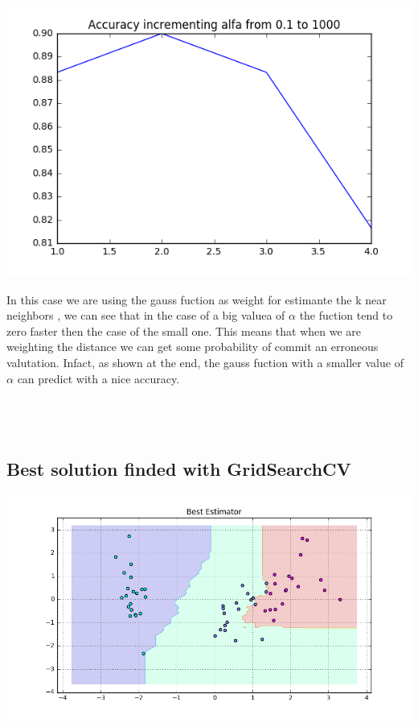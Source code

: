 \documentclass[11pt]{article}
\theoremstyle{plain}
\begin{document}
\begin{center}
\includegraphics[scale=0.44]{5}
\end{center}

In this case we are using the gauss fuction as weight for estimante the k near neighbors , we can see that in the case of a big valuea of  $\alpha$ the fuction tend to zero faster then the case of the small one.
This means that when we are weighting the distance we can get some probability of commit an erroneous valutation. Infact, as shown at the end, the gauss fuction with a smaller value of $\alpha$ can predict with a nice accuracy. 
\\
\\
\\
\\
\subsection{Best solution finded with GridSearchCV}


\begin{center}
\includegraphics[scale=0.44]{6}
\end{center}
\end{document}
